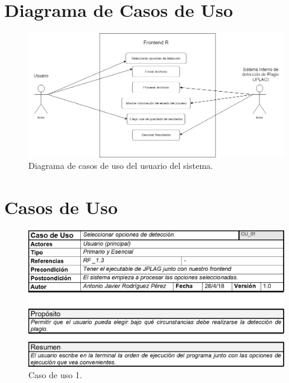 \section{Diagrama de Casos de Uso}

\begin{figure}[H] %
\centering
\includegraphics[scale=0.45]{imagenes/Diagrama_CU.png}  %
\caption{Diagrama de casos de uso del usuario del sistema.} \label{fig:figura4}
\end{figure}

\section{Casos de Uso}

\begin{figure}[H] %
\centering
\includegraphics[scale=0.5]{imagenes/CU_01.png}  %
\caption{Caso de uso 1.} \label{fig:CU1}
\end{figure}

